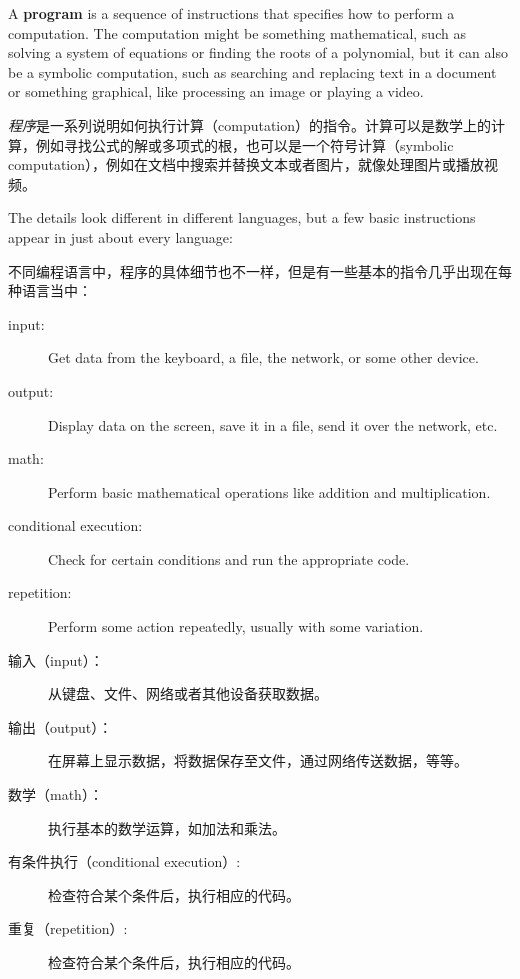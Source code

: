 A {\bf program} is a sequence of instructions that specifies how to
perform a computation.  The computation might be something
mathematical, such as solving a system of equations or finding the
roots of a polynomial, but it can also be a symbolic computation, such
as searching and replacing text in a document or something
graphical, like processing an image or playing a video.

\emph{程序}是一系列说明如何执行计算（computation）的指令。计算可以是数学上的计算，例如寻找公式的解或多项式的根，也可以是一个符号计算（symbolic computation），例如在文档中搜索并替换文本或者图片，就像处理图片或播放视频。

The details look different in different languages, but a few basic
instructions appear in just about every language:

不同编程语言中，程序的具体细节也不一样，但是有一些基本的指令几乎出现在每种语言当中：

\begin{description}

\item[input:] Get data from the keyboard, a file, the network, or some
other device.

\item[output:] Display data on the screen, save it in a
file, send it over the network, etc.

\item[math:] Perform basic mathematical operations like addition and
multiplication.

\item[conditional execution:] Check for certain conditions and
run the appropriate code.

\item[repetition:] Perform some action repeatedly, usually with
some variation.

\end{description}

\begin{description}

\item[输入（input）：] 从键盘、文件、网络或者其他设备获取数据。

\item[输出（output）：] 在屏幕上显示数据，将数据保存至文件，通过网络传送数据，等等。

\item[数学（math）：] 执行基本的数学运算，如加法和乘法。

\item[有条件执行（conditional execution）:] 检查符合某个条件后，执行相应的代码。

\item[重复（repetition）:] 检查符合某个条件后，执行相应的代码。

\end{description}

